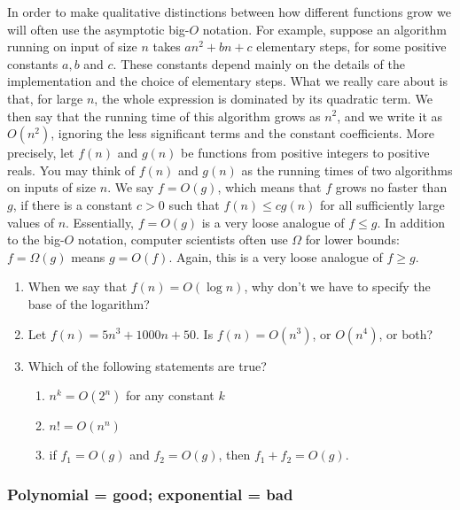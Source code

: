 \documentclass[fleqn]{article}
\providecommand{\tightlist}{%
  \setlength{\itemsep}{0pt}\setlength{\parskip}{0pt}}
\renewcommand{\footnote}[1]{\en{#1}}
\begin{document}
In order to make qualitative distinctions between how different functions grow we will often use the asymptotic big-\(O\) notation.
For example, suppose an algorithm running on input of size \(n\) takes \(a n^2+bn+c\) elementary steps, for some positive constants \(a, b\) and \(c\).
These constants depend mainly on the details of the implementation and the choice of elementary steps.
What we really care about is that, for large \(n\), the whole expression is dominated by its quadratic term.
We then say that the running time of this algorithm grows as \(n^2\), and we write it as \(O(n^2)\), ignoring the less significant terms and the constant coefficients.
More precisely, let \(f(n)\) and \(g(n)\) be functions from positive integers to positive reals.
You may think of \(f(n)\) and \(g(n)\) as the running times of two algorithms on inputs of size \(n\).
We say \(f=O(g)\),\footnote{\(f=O(g)\) is pronounced as ``\(f\) is big-oh of \(g\)''.} which means that \(f\) grows no faster than \(g\), if there is a constant \(c>0\) such that \(f(n)\leqslant c g(n)\) for all sufficiently large values of \(n\).
Essentially, \(f=O(g)\) is a very loose analogue of \(f \leqslant g\).
In addition to the big-\(O\) notation, computer scientists often use \(\Omega\) for lower bounds: \(f=\Omega (g)\) means \(g=O(f)\).
Again, this is a very loose analogue of \(f \geqslant g\).

\begin{enumerate}
\def\labelenumi{\arabic{enumi}.}
\item
  When we say that \(f(n)=O(\log n)\), why don't we have to specify the base of the logarithm?
\item
  Let \(f(n)=5n^3+1000n+50\). Is \(f(n)=O(n^3)\), or \(O(n^4)\), or both?
\item
  Which of the following statements are true?

  \begin{enumerate}
  \def\labelenumii{\alph{enumii}.}
  \tightlist
  \item
    \(n^k=O(2^n)\) for any constant \(k\)
  \item
    \(n!=O(n^n)\)
  \item
    if \(f_1=O(g)\) and \(f_2=O(g)\), then \(f_1+f_2=O(g)\).
  \end{enumerate}
\end{enumerate}

\hypertarget{polynomial-good-exponential-bad}{%
\subsubsection{Polynomial = good; exponential = bad}\label{polynomial-good-exponential-bad}}
\end{document}
